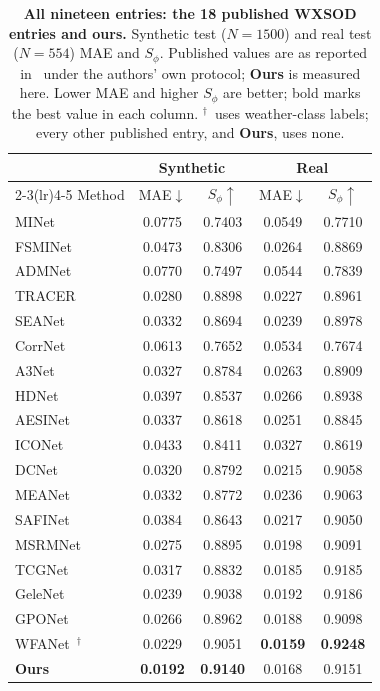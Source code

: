 \documentclass[10pt,a4paper,twocolumn,twoside]{article}
\begin{document}
\begin{table}[!tb]
\centering
\caption{\textbf{All nineteen entries: the 18 published WXSOD entries and ours.}
Synthetic test ($N{=}1500$) and real test ($N{=}554$) MAE and $S_\phi$. Published values are
as reported in~\cite{wxsod2025} under the authors' own protocol; \textbf{Ours} is measured
here. Lower MAE and higher $S_\phi$ are better; bold marks the best value in each column.
$^{\dagger}$~uses weather-class labels; every other published entry, and \textbf{Ours},
uses none.}
\label{tab:full19}
\scriptsize
\begin{tabular}{@{}lcccc@{}}
\toprule
& \multicolumn{2}{c}{Synthetic} & \multicolumn{2}{c}{Real} \\
\cmidrule(lr){2-3}\cmidrule(lr){4-5}
Method & MAE$\downarrow$ & $S_\phi\uparrow$ & MAE$\downarrow$ & $S_\phi\uparrow$ \\
\midrule
MINet~\cite{minet}            & 0.0775 & 0.7403 & 0.0549 & 0.7710 \\
FSMINet~\cite{fsminet}        & 0.0473 & 0.8306 & 0.0264 & 0.8869 \\
ADMNet~\cite{admnet}          & 0.0770 & 0.7497 & 0.0544 & 0.7839 \\
TRACER~\cite{tracer}          & 0.0280 & 0.8898 & 0.0227 & 0.8961 \\
SEANet~\cite{seanet}          & 0.0332 & 0.8694 & 0.0239 & 0.8978 \\
CorrNet~\cite{corrnet}        & 0.0613 & 0.7652 & 0.0534 & 0.7674 \\
A3Net~\cite{a3net}            & 0.0327 & 0.8784 & 0.0263 & 0.8909 \\
HDNet~\cite{hdnet}            & 0.0397 & 0.8537 & 0.0266 & 0.8938 \\
AESINet~\cite{aesinet}        & 0.0337 & 0.8618 & 0.0251 & 0.8845 \\
ICONet~\cite{iconet}          & 0.0433 & 0.8411 & 0.0327 & 0.8619 \\
DCNet~\cite{dcnet}            & 0.0320 & 0.8792 & 0.0215 & 0.9058 \\
MEANet~\cite{meanet}          & 0.0332 & 0.8772 & 0.0236 & 0.9063 \\
SAFINet~\cite{safinet}        & 0.0384 & 0.8643 & 0.0217 & 0.9050 \\
MSRMNet~\cite{msrmnet}        & 0.0275 & 0.8895 & 0.0198 & 0.9091 \\
TCGNet~\cite{tcgnet}          & 0.0317 & 0.8832 & 0.0185 & 0.9185 \\
GeleNet~\cite{gelenet}        & 0.0239 & 0.9038 & 0.0192 & 0.9186 \\
GPONet~\cite{gponet}          & 0.0266 & 0.8962 & 0.0188 & 0.9098 \\
WFANet~\cite{wxsod2025}$^{\dagger}$ & 0.0229 & 0.9051 & \textbf{0.0159} & \textbf{0.9248} \\
\midrule
\textbf{Ours}                 & \textbf{0.0192} & \textbf{0.9140} & 0.0168 & 0.9151 \\
\bottomrule
\end{tabular}
\end{table}
\end{document}
